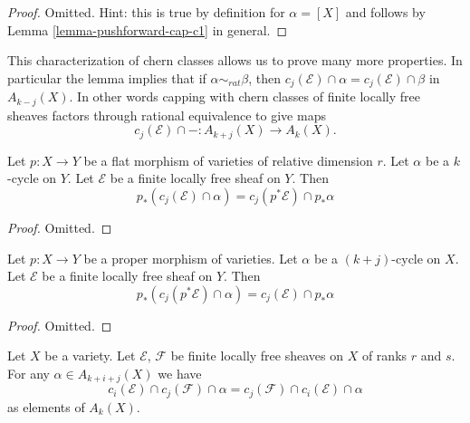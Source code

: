 \begin{proof}
Omitted. Hint: this is true by definition for
$\alpha = [X]$ and follows by Lemma \ref{lemma-pushforward-cap-c1}
in general.
\end{proof}

\noindent
This characterization of chern classes allows us to prove many more
properties. In particular the lemma implies that
if $\alpha \sim_{rat} \beta$, then
$c_j(\mathcal{E}) \cap \alpha = c_j(\mathcal{E}) \cap \beta$
in $A_{k - j}(X)$. In other words capping with chern classes of
finite locally free sheaves factors through rational equivalence
to give maps
$$
c_j(\mathcal{E}) \cap - :
A_{k + j}(X) \to A_k(X).
$$

\begin{lemma}
\label{lemma-flat-pushback-cap-cj}
Let $p : X \to Y$ be a flat morphism of varieties of relative dimension $r$.
Let $\alpha$ be a $k$-cycle on $Y$.
Let $\mathcal{E}$ be a finite locally free sheaf on $Y$.
Then
$$
p_*(c_j(\mathcal{E}) \cap \alpha) = c_j(p^*\mathcal{E}) \cap p_*\alpha
$$
\end{lemma}

\begin{proof}
Omitted.
\end{proof}

\begin{lemma}
\label{lemma-pushforward-cap-cj}
Let $p : X \to Y$ be a proper morphism of varieties.
Let $\alpha$ be a $(k + j)$-cycle on $X$.
Let $\mathcal{E}$ be a finite locally free sheaf on $Y$.
Then
$$
p_*(c_j(p^*\mathcal{E}) \cap \alpha) = c_j(\mathcal{E}) \cap p_*\alpha
$$
\end{lemma}

\begin{proof}
Omitted.
\end{proof}

\begin{lemma}
\label{lemma-cap-commutative-chern}
Let $X$ be a variety.
Let $\mathcal{E}$, $\mathcal{F}$ be finite locally free sheaves on $X$
of ranks $r$ and $s$.
For any $\alpha \in A_{k + i + j}(X)$ we have
$$
c_i(\mathcal{E}) \cap c_j(\mathcal{F}) \cap \alpha
=
c_j(\mathcal{F}) \cap c_i(\mathcal{E}) \cap \alpha
$$
as elements of $A_k(X)$.
\end{lemma}

